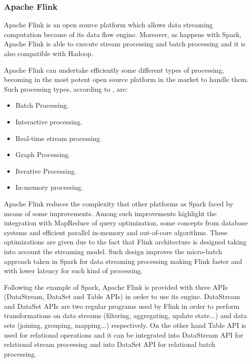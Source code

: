 \subsubsection{Apache Flink}

Apache Flink is an open source platform which allows data streaming computation because of its data flow engine. Moreover, as happens with Spark, Apache Flink is able to execute stream processing and batch processing and it is also compatible with Hadoop.

Apache Flink can undertake efficiently some different types of processing, becoming in the most potent open source platform in the market to handle them. Such processing types, according to \cite{flinkwebsite}, are:

\begin{itemize}

\item Batch Processing.
\item Interactive processing.
\item Real-time stream processing.
\item Graph Processing.
\item Iterative Processing.
\item In-memory processing.

\end{itemize}

Apache Flink reduces the complexity that other platforms as Spark faced by means of some improvements. Among such improvements highlight the integration with MapReduce of query optimization, some concepts from database systems and efficient parallel in-memory and out-of-core algorithms. These optimizations are given due to the fact that Flink architecture is designed taking into account the streaming model. Such design improves the micro-batch approach taken in Spark for data streaming processing making Flink faster and with lower latency for such kind of processing.

Following the example of Spark, Apache Flink is provided with three APIs (DataStream, DataSet and Table APIs) in order to use its engine. DataStream and DataSet APIs are two regular programs used by Flink in order to perform transformations on data streams (filtering, aggregating, update state...) and data sets (joining, grouping, mapping...) respectively. On the other hand Table API is used for relational operations and it can be integrated into DataStream API for relational stream processing and into DataSet API for relational batch processing.


